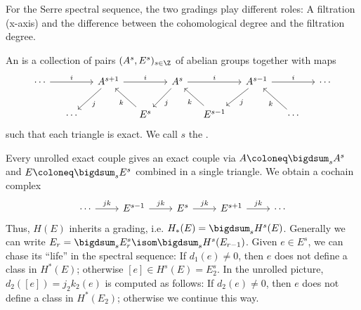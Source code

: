 \documentclass[wip, topology]{bsteffan-lecturenotes}
\begin{document}
For the Serre spectral sequence, the two gradings play different roles:
A filtration (x-axis) and the difference between the cohomological degree and the filtration degree.
\begin{definition}
	An  is a collection of pairs $(A^s, E^s)_{s \in \Z}$ of abelian groups together with maps
	\begin{equation*}
		\begin{tikzcd}[column sep = small]
			\cdots	
					\ar[rr, "i"]
				& & A^{s + 1}
					\ar[rr, "i"]
					\ar[dl, "j"]
				& & A^s
					\ar[rr, "i"]
					\ar[dl, "j"]
				& & A^{s - 1}
					\ar[rr, "i"]
					\ar[dl, "j"]
				& & \cdots
			\\
				& \cdots
				& & E^s
					\ar[ul, "k"]
				& & E^{s - 1}
					\ar[ul, "k"]
				& & \cdots
					\ar[ul, "k"]
		\end{tikzcd}
	\end{equation*}
	such that each triangle is exact.
	We call $s$ the .
\end{definition}
Every unrolled exact couple gives an exact couple via $A \coloneq \bigdsum_s A^s$ and $E \coloneq \bigdsum_s E^s$ combined in a single triangle.
We obtain a cochain complex
\begin{equation*}
	\begin{tikzcd}
		\cdots
				\ar[r, "jk"]
			& E^{s - 1}
				\ar[r, "jk"]
			& E^s
				\ar[r, "jk"]
			& E^{s + 1}
				\ar[r, "jk"]
			& \cdots
	\end{tikzcd}
\end{equation*}
Thus, $H(E)$ inherits a grading, i.e. $H_*(E) = \bigdsum_s H^s(E)$.
Generally we can write $E_r = \bigdsum_s E_r^s \isom \bigdsum_s H^s(E_{r - 1})$.
Given $e \in E^s$, we can chase its \enquote{life} in the spectral sequence:
If $d_1(e) \neq 0$, then $e$ does not define a class in $H^*(E)$; otherwise $[e] \in H^s(E) = E_2^s$.
In the unrolled picture, $d_2([e]) = j_2 k_2(e)$ is computed as follows:
If $d_2(e) \neq 0$, then $e$ does not define a class in $H^*(E_2)$; otherwise we continue this way.
\end{document}
